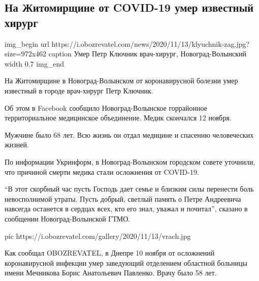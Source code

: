  
 
 

\subsection{На Житомирщине от COVID-19 умер известный хирург}



\ifcmt
img_begin 
	url https://i.obozrevatel.com/news/2020/11/13/klyuchnik-zag.jpg?size=972x462
	caption Умер Петр Ключник \dshM врач-хирург, Новоград-Волынский
	width 0.7
img_end
\fi

На Житомирщине в Новоград-Волынском от коронавирусной болезни умер известный в
городе врач-хирург Петр Ключник.

Об этом в Facebook сообщило Новоград-Волынское горрайонное территориальное
медицинское объединение. Медик скончался 12 ноября. 

Мужчине было 68 лет. Всю жизнь он отдал медицине и спасению человеческих
жизней.

По информации Укринформ, в Новоград-Волынском городском совете уточнили, что
причиной смерти медика стали осложнения от COVID-19.

\enquote{В этот скорбный час пусть Господь дает семье и близким силы перенести боль
невосполнимой утраты. Пусть добрый, светлый память о Петре Андреевича навсегда
останется в сердцах всех, кто его знал, уважал и почитал}, \dshM сказано в
сообщении Новоград-Волынской ГТМО.

\ifcmt
pic https://i.obozrevatel.com/gallery/2020/11/13/vrach.jpg
\fi

Как сообщал OBOZREVATEL, в Днепре 10 ноября от осложнений коронавирусной
инфекции умер заведующий отделением областной больницы имени Мечникова Борис
Анатольевич Павленко. Врачу было 58
лет.
